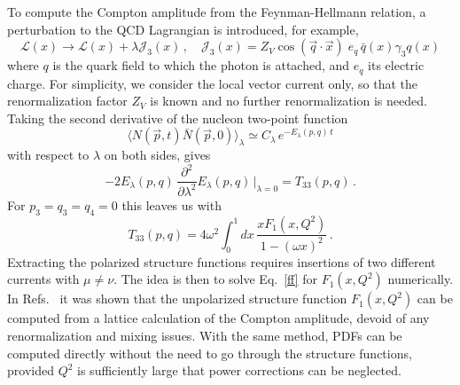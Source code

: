 To compute the Compton amplitude from the Feynman-Hellmann relation, a 
perturbation to the QCD Lagrangian is introduced, for example,
\begin{equation}
\mathcal{L}(x) 
\rightarrow 
\mathcal{L}(x) + \lambda \mathcal{J}_3(x)\,, 
\quad 
\mathcal{J}_3(x)
=
Z_V\cos(\vec{q} \cdot \vec{x})\; 
e_q \,\bar{q}(x)\gamma_3 q(x) 
\label{in}
\end{equation}
where $q$ is the quark field to which the photon is attached, and $e_q$ its 
electric charge. 
%
For simplicity, we consider the local vector current only, so that the 
renormalization factor $Z_V$ is known and no further renormalization is needed. 
%
Taking the second derivative of the nucleon two-point function 
\begin{equation}
\langle N(\vec{p},t) \bar{N}(\vec{p},0)\rangle_\lambda 
\simeq 
C_\lambda\, e^{-E_\lambda(p,q)\,t}
\end{equation}
with respect to $\lambda$ on both sides, gives
\begin{equation}
-2 E_\lambda(p,q)\, 
\frac{\partial^2}{\partial\lambda^2}  E_\lambda(p,q)\,\big|_{\lambda=0} 
= 
T_{33}(p,q) \,.
\end{equation}
For $p_3=q_3=q_4=0$ this leaves us with
\begin{equation}
T_{33}(p,q) 
= 
4 \omega^2 \int_0^1 dx\,  \frac{xF_1(x,Q^2)}{1-(\omega x)^2} \,.
\label{ff}
\end{equation}
%
Extracting the polarized structure functions requires insertions of two 
different currents with $\mu\neq \nu$. 
%
The idea is then to solve Eq.~\eqref{ff} for $F_1(x,Q^2)$ numerically.
%
In Refs.~\cite{Ji:2001wha,Chambers:2017dov} it was shown that the unpolarized 
structure function $F_1(x,Q^2)$ can be computed from a lattice calculation 
of the Compton amplitude, devoid of any renormalization and mixing issues. 
With the same method, PDFs can be computed directly without the need to go 
through the structure functions, provided $Q^2$ is sufficiently large that 
power corrections can be neglected. 

